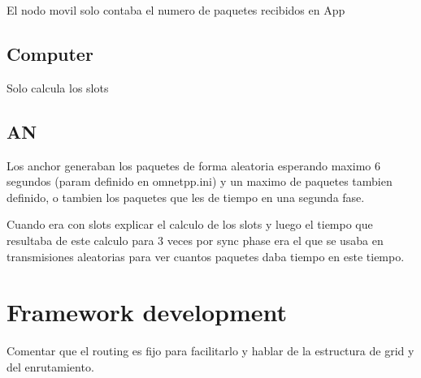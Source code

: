 El nodo movil solo contaba el numero de paquetes recibidos en App

\subsection{Computer}

Solo calcula los slots

\subsection{\ac{AN}}

Los anchor generaban los paquetes de forma aleatoria esperando maximo 6 segundos (param definido en omnetpp.ini) y un maximo de paquetes tambien 
definido, o tambien los paquetes que les de tiempo en una segunda fase.

Cuando era con slots explicar el calculo de los slots y luego el tiempo que resultaba de este calculo para 3 veces por sync phase era el que se 
usaba en transmisiones aleatorias para ver cuantos paquetes daba tiempo en este tiempo.


\section{Framework development}
\label{sec:frameworkdevelopment}

Comentar que el routing es fijo para facilitarlo y hablar de la estructura de grid y del enrutamiento.
